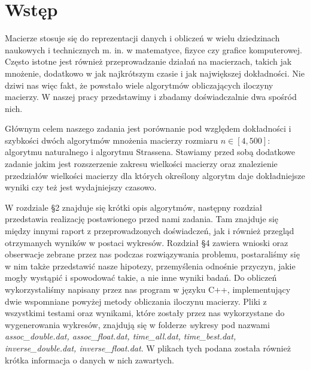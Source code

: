 \section{Wstęp}
Macierze stosuje się do reprezentacji danych i obliczeń w wielu dziedzinach
naukowych i technicznych m. in. w matematyce, fizyce czy grafice komputerowej.
Często istotne jest również przeprowadzanie działań na macierzach, takich jak
mnożenie, dodatkowo w jak najkrótszym czasie i jak największej dokładności. Nie dziwi nas więc fakt, że
powstało wiele algorytmów obliczających iloczyny macierzy. W naszej pracy
przedstawimy i zbadamy doświadczalnie dwa spośród nich.

Głównym celem naszego zadania jest porównanie pod względem dokładności i
szybkości dwóch algorytmów mnożenia macierzy rozmiaru $n \in [4, 500]$:
algorytmu naturalnego i algorytmu Strassena. Stawiamy przed sobą dodatkowe
zadanie jakim jest rozszerzenie zakresu wielkości macierzy oraz znalezienie
przedziałów wielkości macierzy dla których określony algorytm daje
dokładniejsze wyniki czy też jest wydajniejszy czasowo.

W rozdziale \S2 znajduje się krótki opis algorytmów, następny rozdział przedstawia realizację 
postawionego przed nami zadania. Tam znajduje się między innymi raport
z przeprowadzonych doświadczeń, jak i również przegląd otrzymanych wyników w
postaci wykresów. Rozdział \S 4 zawiera wnioski oraz obserwacje zebrane przez nas podczas 
rozwiązywania problemu, postaraliśmy się w nim także przedstawić nasze hipotezy, przemyślenia 
odnośnie przyczyn, jakie mogły wystąpić i spowodować takie, a nie inne wyniki badań.
Do obliczeń wykorzystaliśmy napisany przez nas program w języku C++, implementujący
dwie wspomniane powyżej metody obliczania iloczynu macierzy. Pliki z wszystkimi testami
oraz wynikami, które zostały przez nas wykorzystane do wygenerowania wykresów, znajdują
się w folderze {\textit wykresy} pod nazwami \textit{assoc\_double.dat, assoc\_float.dat, time\_all.dat,
time\_best.dat, inverse\_double.dat, inverse\_float.dat}.
W plikach tych podana została również krótka informacja o danych w nich zawartych.

